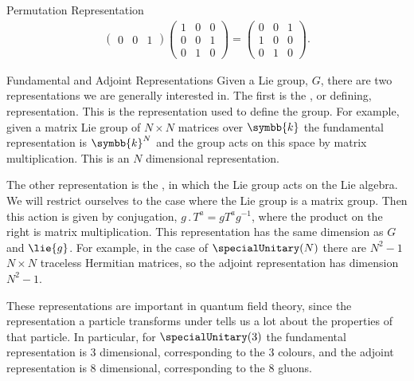 \documentclass[fleqn]{NotesClass}
\renewcommand{\field}{\symbb{k}}
\newcommand{\action}{\mathbin{.}}
\begin{document}
\begin{exm}{Permutation Representation}{}
\begin{multline}
\begin{pmatrix}
                0 & 0 & 1
            \end{pmatrix}
            \begin{pmatrix}
                1 & 0 & 0\\
                0 & 0 & 1\\
                0 & 1 & 0
            \end{pmatrix}
            = 
            \begin{pmatrix}
                0 & 0 & 1\\
                1 & 0 & 0\\
                0 & 1 & 0
            \end{pmatrix}
            .
        \end{multline}
    \end{exm}
    
    \begin{exm}{Fundamental and Adjoint Representations}{}
        Given a Lie group, \(G\), there are two representations we are generally interested in.
        The first is the , or defining, representation.
        This is the representation used to define the group.
        For example, given a matrix Lie group of \(N \times N\) matrices over \(\field\) the fundamental representation is \(\field^N\) and the group acts on this space by matrix multiplication.
        This is an \(N\) dimensional representation.
        
        The other representation is the , in which the Lie group acts on the Lie algebra.
        We will restrict ourselves to the case where the Lie group is a matrix group.
        Then this action is given by conjugation, \(g \action T^a = gT^a g^{-1}\), where the product on the right is matrix multiplication.
        This representation has the same dimension as \(G\) and \(\lie{g}\).
        For example, in the case of \(\specialUnitary(N)\) there are \(N^2 - 1\) \(N \times N\) traceless Hermitian matrices, so the adjoint representation has dimension \(N^2 - 1\).
        
        These representations are important in quantum field theory, since the representation a particle transforms under tells us a lot about the properties of that particle.
        In particular, for \(\specialUnitary(3)\) the fundamental representation is 3 dimensional, corresponding to the 3 colours, and the adjoint representation is 8 dimensional, corresponding to the 8 gluons.
    \end{exm}
    
\end{document}
